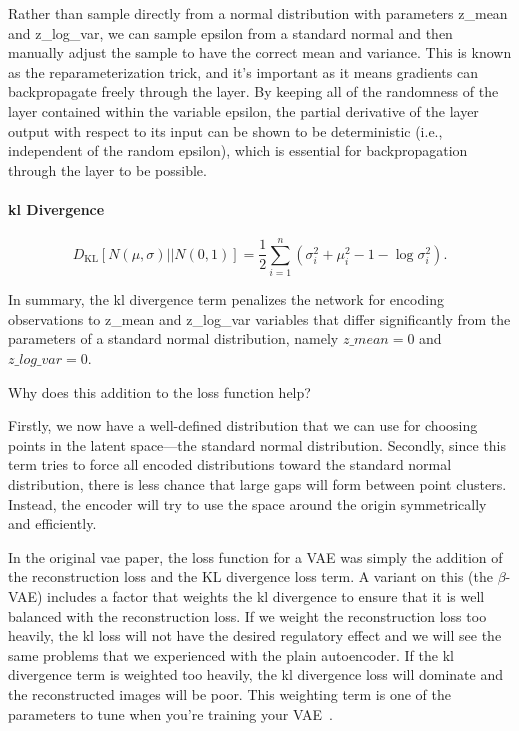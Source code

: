Rather than sample directly from a normal distribution with parameters z\_mean and z\_log\_var, we can sample epsilon from a standard normal and then manually adjust the sample to have the correct mean and variance.
This is known as the reparameterization trick, and it’s important as it means gradients can backpropagate freely through the layer.
By keeping all of the randomness of the layer contained within the variable epsilon, the partial derivative of the layer output with respect to its input can be shown to be deterministic (i.e., independent of the random epsilon), which is essential for backpropagation through the layer to be possible.

\paragraph{\gls{kl} Divergence}

\[
	D_{\mathrm{KL}}\left[N\left(\mu,\sigma\right)||N\left(0,1\right)\right] = \frac{1}{2} \sum_{i=1}^n \left(\sigma_i^2 + \mu_i^2 - 1 - \log \sigma_i^2\right)
	.\]


In summary, the \gls{kl}  divergence term penalizes the network for encoding observations to  z\_mean and  z\_log\_var  variables that differ significantly from the parameters of a standard normal distribution, namely \( z\_mean = 0 \) and \( z\_log\_var = 0 \).

Why does this addition to the loss function help?

Firstly, we now have a well-defined distribution that we can use for choosing points in the latent space—the standard normal distribution.
Secondly, since this term tries to force all encoded distributions toward the standard normal distribution, there is less chance that large gaps will form between point clusters.
Instead, the encoder will try to use the space around the origin symmetrically and efficiently.

In the original \gls{vae}  paper, the loss function for a VAE was simply the addition of the reconstruction loss and the KL divergence loss term.
A variant on this (the $\beta$-VAE) includes a factor that weights the \gls{kl}  divergence to ensure that it is well balanced with the reconstruction loss.
If we weight the reconstruction loss too heavily, the \gls{kl} loss will not have the desired regulatory effect and we will see the same problems that we experienced with the plain autoencoder.
If the \gls{kl}  divergence term is weighted too heavily, the \gls{kl}  divergence loss will dominate and the reconstructed images will be poor. This weighting term is one of the parameters to tune when you’re training your VAE~\cite{foster2022generative}.


